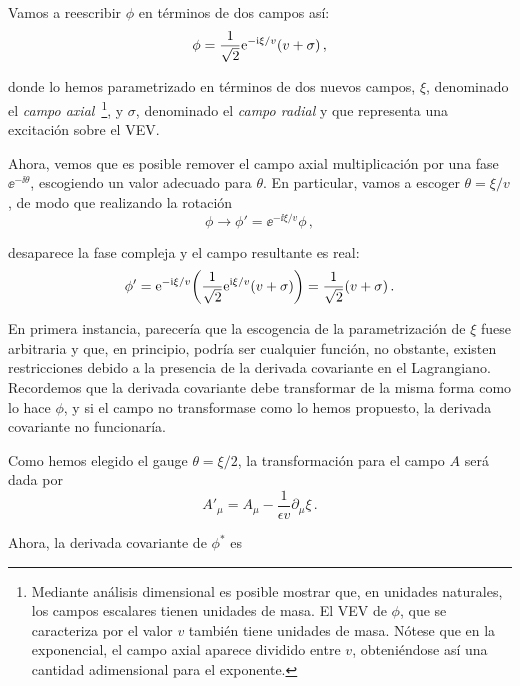 Vamos a reescribir $\phi$ en términos de dos campos así:
%
\begin{equation}
    \phi = \frac{1}{\sqrt{2}} \mathrm{e}^{-\mathrm{i} \xi/v} \qty(v + \sigma) \,,
\end{equation}

\noindent donde lo hemos parametrizado en términos de dos nuevos campos, $\xi$, denominado el \emph{campo axial}~\footnote{Mediante análisis dimensional es posible mostrar que, en unidades naturales, los campos escalares tienen unidades de masa. El VEV de $\phi$, que se caracteriza por el valor $v$ también tiene unidades de masa. Nótese que en la exponencial, el campo axial aparece dividido entre $v$, obteniéndose así una cantidad adimensional para el exponente.}, y $\sigma$, denominado el \emph{campo radial} y que representa una excitación sobre el VEV.

Ahora, vemos que es posible remover el campo axial multiplicación por una fase $\ee^{-\ii \theta}$, escogiendo un valor adecuado para $\theta$. En particular, vamos a escoger $\theta = \xi/v$, de modo que realizando la rotación
%
\begin{equation}
    \phi \longrightarrow \phi' = \ee^{-\ii \xi/v} \phi \,,
\end{equation}

\noindent desaparece la fase compleja y el campo resultante es real:
%
\begin{equation}
    \phi' = \mathrm{e}^{-\mathrm{i} \xi/v} \qty(\frac{1}{\sqrt{2}}\mathrm{e}^{\mathrm{i} \xi/v} (v + \sigma))  = \frac{1}{\sqrt{2}} (v + \sigma) \,.
\end{equation}

En primera instancia, parecería que la escogencia de la parametrización de $\xi$ fuese arbitraria y que, en principio, podría ser cualquier función, no obstante, existen restricciones debido a la presencia de la derivada covariante en el Lagrangiano. Recordemos que la derivada covariante debe transformar de la misma forma como lo hace $\phi$, y si el campo no transformase como lo hemos propuesto, la derivada covariante no funcionaría.

Como hemos elegido el gauge $\theta = \xi/2$, la transformación para el campo $A$ será dada por
%
\begin{equation}
    A'_\mu = A_\mu - \frac{1}{\epsilon v} \partial_\mu \xi \,.
\end{equation}

Ahora, la derivada covariante de $\phi^*$ es
%

